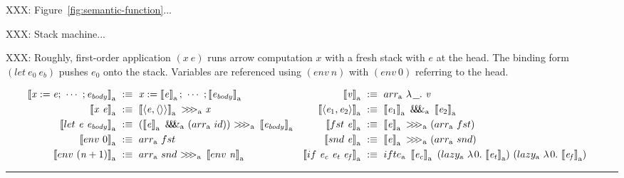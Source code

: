 \documentclass[preprint]{sigplanconf}
\newcommand{\arrow}{\rightsquigarrow}
\newcommand{\arrowarr}{\ensuremath{arr}}
\newcommand{\arrowcomp}{\ensuremath{{>}\mspace{-6mu}{>}\mspace{-6mu}{>}}}
\newcommand{\arrowpair}{\ensuremath{\mathit{\&\mspace{-7.5mu}\&\mspace{-7.5mu}\&}}}
\newcommand{\arrowif}{\ensuremath{ifte}}
\newcommand{\arrowlazy}{\ensuremath{lazy}}
\newcommand{\gen}{_\mathrm{a}}
\begin{document}
XXX: Figure~\ref{fig:semantic-function}...

XXX: Stack machine...

XXX: Roughly, first-order application $(\mathit{x~e})$ runs arrow computation $\mathit{x}$ with a fresh stack with $\mathit{e}$ at the head.
The binding form $(let~\mathit{e}_0~\mathit{e_b})$ pushes $\mathit{e}_0$ onto the stack.
Variables are referenced using $(env~\mathit{n})$ with $(env~0)$ referring to the head.

\begin{figure*}[t]\centering
\begin{align*}
\begin{aligned}[t]
	\meaningof{\mathit{x} := \mathit{e};\ \cdots\ ; \mathit{e_{body}}}\gen &\ :\equiv\
		\mathit{x} := \meaningof{\mathit{e}}\gen;\ \cdots \ ; \meaningof{\mathit{e_{body}}}\gen \\
	\meaningof{\mathit{x}~\mathit{e}}\gen &\ :\equiv\
		\meaningof{\pair{\mathit{e},\pair{}}}\gen~\arrowcomp\gen~\mathit{x}
\\
	\meaningof{let~\mathit{e}~\mathit{e_{body}}}\gen &\ :\equiv\ 
		(\meaningof{\mathit{e}}\gen~\arrowpair\gen~(\arrowarr\gen~id))~
			\arrowcomp\gen~
		\meaningof{\mathit{e_{body}}}\gen
\\
	\meaningof{env~0}\gen &\ :\equiv\ \arrowarr\gen~fst
\\
	\meaningof{env~(\mathit{n}+1)}\gen &\ :\equiv\ \arrowarr\gen~snd~\arrowcomp\gen~\meaningof{env~\mathit{n}}\gen
\end{aligned}
&\tab
\begin{aligned}[t]
	\meaningof{\mathit{v}}\gen &\ :\equiv\ \arrowarr\gen~\fun{\underline{\ \ }}{\mathit{v}}
\\
	\meaningof{\pair{\mathit{e}_1,\mathit{e}_2}}\gen &\ :\equiv\
		\meaningof{\mathit{e}_1}\gen~\arrowpair\gen~\meaningof{\mathit{e}_2}\gen
\\
	\meaningof{fst~\mathit{e}}\gen &\ :\equiv\
		\meaningof{\mathit{e}}\gen~\arrowcomp\gen~(\arrowarr\gen~fst)
\\
	\meaningof{snd~\mathit{e}}\gen &\ :\equiv\
		\meaningof{\mathit{e}}\gen~\arrowcomp\gen~(\arrowarr\gen~snd)
\\
	\meaningof{if~\mathit{e_c}~\mathit{e_t}~\mathit{e_f}}\gen &\ :\equiv\
		\arrowif\gen~
			\meaningof{\mathit{e_c}}\gen~
			(\arrowlazy\gen~\fun{0}{\meaningof{\mathit{e_t}}\gen})~
			(\arrowlazy\gen~\fun{0}{\meaningof{\mathit{e_f}}\gen})
\end{aligned}
\end{align*}
\hrule
\caption{Transformation from a let-calculus with first-order definitions and De-Bruijn-indexed bindings to computations in arrow $\mathrm{a}$.
}
\label{fig:semantic-function}
\end{figure*}
\end{document}

